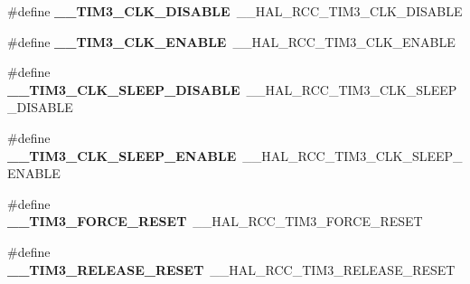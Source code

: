 \begin{DoxyCompactItemize}
\item 
\#define {\bfseries \+\_\+\+\_\+\+T\+I\+M3\+\_\+\+C\+L\+K\+\_\+\+D\+I\+S\+A\+B\+LE}~\+\_\+\+\_\+\+H\+A\+L\+\_\+\+R\+C\+C\+\_\+\+T\+I\+M3\+\_\+\+C\+L\+K\+\_\+\+D\+I\+S\+A\+B\+LE\hypertarget{group___h_a_l___r_c_c___aliased_gae6a6297aa614c719a6c8f8da6aa03149}{}\label{group___h_a_l___r_c_c___aliased_gae6a6297aa614c719a6c8f8da6aa03149}

\item 
\#define {\bfseries \+\_\+\+\_\+\+T\+I\+M3\+\_\+\+C\+L\+K\+\_\+\+E\+N\+A\+B\+LE}~\+\_\+\+\_\+\+H\+A\+L\+\_\+\+R\+C\+C\+\_\+\+T\+I\+M3\+\_\+\+C\+L\+K\+\_\+\+E\+N\+A\+B\+LE\hypertarget{group___h_a_l___r_c_c___aliased_gaba986ca28ba487793c6eaa1f659ada7c}{}\label{group___h_a_l___r_c_c___aliased_gaba986ca28ba487793c6eaa1f659ada7c}

\item 
\#define {\bfseries \+\_\+\+\_\+\+T\+I\+M3\+\_\+\+C\+L\+K\+\_\+\+S\+L\+E\+E\+P\+\_\+\+D\+I\+S\+A\+B\+LE}~\+\_\+\+\_\+\+H\+A\+L\+\_\+\+R\+C\+C\+\_\+\+T\+I\+M3\+\_\+\+C\+L\+K\+\_\+\+S\+L\+E\+E\+P\+\_\+\+D\+I\+S\+A\+B\+LE\hypertarget{group___h_a_l___r_c_c___aliased_ga6fbed2df3a86b61e52b2bdcea4d29988}{}\label{group___h_a_l___r_c_c___aliased_ga6fbed2df3a86b61e52b2bdcea4d29988}

\item 
\#define {\bfseries \+\_\+\+\_\+\+T\+I\+M3\+\_\+\+C\+L\+K\+\_\+\+S\+L\+E\+E\+P\+\_\+\+E\+N\+A\+B\+LE}~\+\_\+\+\_\+\+H\+A\+L\+\_\+\+R\+C\+C\+\_\+\+T\+I\+M3\+\_\+\+C\+L\+K\+\_\+\+S\+L\+E\+E\+P\+\_\+\+E\+N\+A\+B\+LE\hypertarget{group___h_a_l___r_c_c___aliased_gae893042ae5e7b7f5df7dddacb5b3698e}{}\label{group___h_a_l___r_c_c___aliased_gae893042ae5e7b7f5df7dddacb5b3698e}

\item 
\#define {\bfseries \+\_\+\+\_\+\+T\+I\+M3\+\_\+\+F\+O\+R\+C\+E\+\_\+\+R\+E\+S\+ET}~\+\_\+\+\_\+\+H\+A\+L\+\_\+\+R\+C\+C\+\_\+\+T\+I\+M3\+\_\+\+F\+O\+R\+C\+E\+\_\+\+R\+E\+S\+ET\hypertarget{group___h_a_l___r_c_c___aliased_ga97d9c3f9b7a082c72411747907d3adde}{}\label{group___h_a_l___r_c_c___aliased_ga97d9c3f9b7a082c72411747907d3adde}

\item 
\#define {\bfseries \+\_\+\+\_\+\+T\+I\+M3\+\_\+\+R\+E\+L\+E\+A\+S\+E\+\_\+\+R\+E\+S\+ET}~\+\_\+\+\_\+\+H\+A\+L\+\_\+\+R\+C\+C\+\_\+\+T\+I\+M3\+\_\+\+R\+E\+L\+E\+A\+S\+E\+\_\+\+R\+E\+S\+ET\hypertarget{group___h_a_l___r_c_c___aliased_ga8b8192c731e744d5018630a86deb118b}{}\label{group___h_a_l___r_c_c___aliased_ga8b8192c731e744d5018630a86deb118b}


\end{DoxyCompactItemize}
